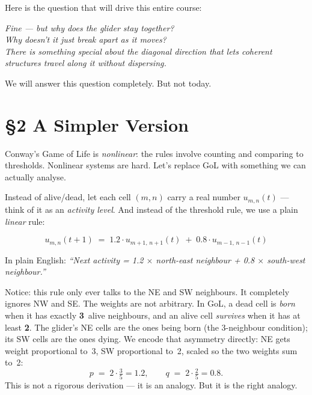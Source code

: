 \documentclass[11pt]{article}
\begin{document}
\medskip\noindent
Here is the question that will drive this entire course:

\medskip
\begin{center}
\colorbox{yellow!25}{\parbox{0.82\textwidth}{
\centering\itshape
Fine — but why does the glider \emph{stay together}?\\[4pt]
Why doesn't it just break apart as it moves?\\[4pt]
There is something special about the diagonal direction that lets
coherent structures travel along it without dispersing.
}}
\end{center}

\medskip\noindent
We will answer this question completely.
But not today.

\bigskip

\section*{\S2 \quad A Simpler Version}

\noindent
Conway's Game of Life is \emph{nonlinear}: the rules involve counting
and comparing to thresholds.
Nonlinear systems are hard.
Let's replace GoL with something we can actually analyse.

\medskip\noindent
Instead of alive/dead, let each cell $(m, n)$ carry a real number
$u_{m,n}(t)$ — think of it as an \emph{activity level}.
And instead of the threshold rule, we use a plain \emph{linear} rule:

\bigskip
\begin{equation}
  \boxed{u_{m,n}(t+1) \;=\; 1.2\cdot u_{m+1,\,n+1}(t) \;+\; 0.8\cdot u_{m-1,\,n-1}(t)}
\end{equation}
\bigskip

\noindent
In plain English: \textit{``Next activity = 1.2 $\times$ north-east neighbour
                           + 0.8 $\times$ south-west neighbour.''}

\medskip\noindent
Notice: this rule only ever talks to the NE and SW neighbours.
It completely ignores NW and SE.
The weights are not arbitrary.
In GoL, a dead cell is \emph{born} when it has exactly \textbf{3}~alive
neighbours, and an alive cell \emph{survives} when it has at least \textbf{2}.
The glider's NE cells are the ones being born (the 3-neighbour condition);
its SW cells are the ones dying.
We encode that asymmetry directly: NE gets weight proportional to~3, SW
proportional to~2, scaled so the two weights sum to~2:
\[
  p \;=\; 2 \cdot \tfrac{3}{5} = 1.2, \qquad
  q \;=\; 2 \cdot \tfrac{2}{5} = 0.8.
\]
This is not a rigorous derivation — it is an analogy.
But it is the right analogy.
\end{document}
